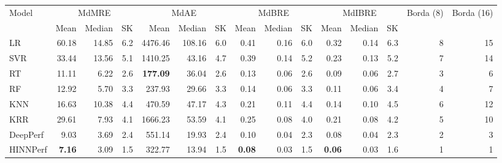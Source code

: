 \begin{tabular}{lrrrrrrrrrrrrrr}
\toprule
Model & \multicolumn{3}{c}{MdMRE} & \multicolumn{3}{c}{MdAE} & \multicolumn{3}{c}{MdBRE} & \multicolumn{3}{c}{MdIBRE} & Borda (8) & Borda (16) \\
 & Mean & Median & SK & Mean & Median & SK & Mean & Median & SK & Mean & Median & SK &  &  \\
\midrule
LR & 60.18 & 14.85 & 6.2 & 4476.46 & 108.16 & 6.0 & 0.41 & 0.16 & 6.0 & 0.32 & 0.14 & 6.3 & 8 & 15 \\
SVR & 33.44 & 13.56 & 5.1 & 1410.25 & 43.16 & 4.7 & 0.39 & 0.14 & 5.2 & 0.23 & 0.13 & 5.2 & 7 & 14 \\
RT & 11.11 & 6.22 & 2.6 & \textbf{177.09} & 36.04 & 2.6 & 0.13 & 0.06 & 2.6 & 0.09 & 0.06 & 2.7 & 3 & 6 \\
RF & 12.92 & 5.70 & 3.3 & 237.93 & 29.66 & 3.3 & 0.14 & 0.06 & 3.3 & 0.11 & 0.06 & 3.4 & 4 & 7 \\
KNN & 16.63 & 10.38 & 4.4 & 470.59 & 47.17 & 4.3 & 0.21 & 0.11 & 4.4 & 0.14 & 0.10 & 4.5 & 6 & 12 \\
KRR & 29.61 & 7.93 & 4.1 & 1666.23 & 53.59 & 4.1 & 0.25 & 0.08 & 4.0 & 0.21 & 0.08 & 4.2 & 5 & 10 \\
DeepPerf & 9.03 & 3.69 & 2.4 & 551.14 & 19.93 & 2.4 & 0.10 & 0.04 & 2.3 & 0.08 & 0.04 & 2.3 & 2 & 3 \\
HINNPerf & \textbf{7.16} & 3.09 & 1.5 & 322.77 & 13.94 & 1.5 & \textbf{0.08} & 0.03 & 1.5 & \textbf{0.06} & 0.03 & 1.6 & 1 & 1 \\
\bottomrule
\end{tabular}
